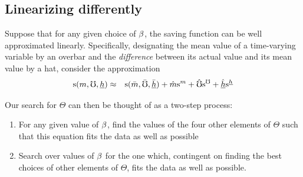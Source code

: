 \documentclass[titlepage]{\econtex}
\begin{document}
\subsection{Linearizing differently}

Suppose that for any given choice of $\beta$, the saving function can be well approximated linearly.  Specifically, designating the mean value of a time-varying variable by an overbar and the \textit{difference} between its actual value and its mean value by a hat, consider the approximation
\begin{eqnarray}
  \mathrm{s}(m,\mho,\underline{h})  & \approx & \mathrm{s}(\bar{m},\bar{\mho},\bar{\underline{h}})+\hat{m} \mathrm{s}^{m}+\hat{\mho} \mathrm{s}^{\mho}+\hat{\underline{h}}\mathrm{s}^{\underline{h}}
\end{eqnarray}

Our search for $\Theta$ can then be thought of as a two-step process:
\begin{enumerate}
\item For any given value of $\beta$, find the values of the four other elements of $\Theta$ such that this equation fits the data as well as possible
  \item Search over values of $\beta$ for the one which, contingent on finding the best choices of other elements of $\Theta$, fits the data as well as possible.
\end{enumerate}
\end{document}
